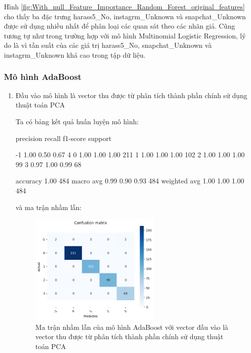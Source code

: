 \begin{enumerate}[label=(\alph*)]
    Hình \ref{fig:With_null_Feature_Importance_Random_Forest_original_features} cho thấy ba đặc trưng harass5\_No, instagrm\_Unknown và snapchat\_Unknown được sử dụng nhiều nhất để phân loại các quan sát theo các nhãn giả.
    Cũng tương tự như trong trường hợp với mô hình Multinomial Logistic Regression, lý do là vì tần suất của các giá trị harass5\_No, snapchat\_Unknown và instagrm\_Unknown khá cao trong tập dữ liệu.
\end{enumerate}

\subsubsection{Mô hình AdaBoost}

\begin{enumerate}[label=(\alph*)]
    \item Đầu vào mô hình là vector thu được từ phân tích thành phần chính sử dụng thuật toán PCA 
    
    Ta có bảng kết quả huấn luyện mô hình:

    \begin{python}
        precision    recall  f1-score   support

          -1       1.00      0.50      0.67         4
           0       1.00      1.00      1.00       211
           1       1.00      1.00      1.00       102
           2       1.00      1.00      1.00        99
           3       0.97      1.00      0.99        68

    accuracy                           1.00       484
   macro avg       0.99      0.90      0.93       484
weighted avg       1.00      1.00      1.00       484
    \end{python}

    và ma trận nhầm lẫn:

    \begin{figure}[H]
        \centering
        \includegraphics[width=0.6\textwidth]{figures/Thanh/Data_Analysis/With_null_confusion_matrix_AdaBoost_PCA_features.png}
        \caption{ Ma trận nhầm lẫn của mô hình AdaBoost với vector đầu vào là vector thu được từ
        phân tích thành phần chính sử dụng thuật toán PCA}
        \label{fig:With_null_confusion_matrix_AdaBoost_PCA_features}
    \end{figure}


\end{enumerate}
